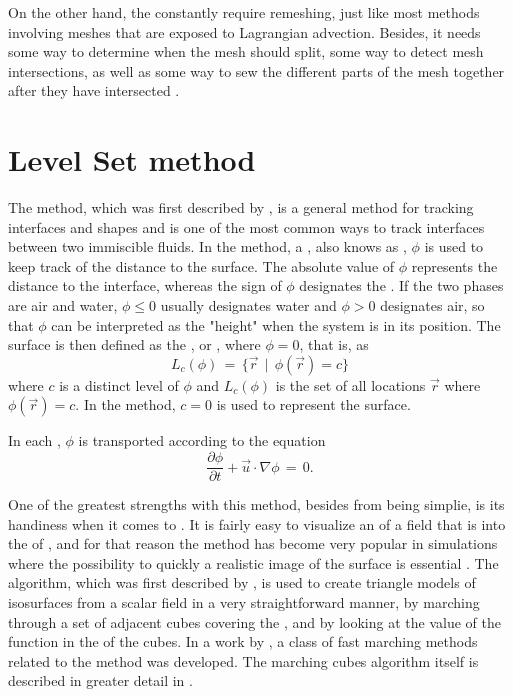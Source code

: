 On the other hand, the constantly require remeshing, just like most methods involving meshes that are exposed to Lagrangian advection. Besides, it needs some way to determine when the mesh should split, some way to detect mesh intersections, as well as some way to sew the different parts of the mesh together after they have intersected \citep{Wojtan2009}.

\section{Level Set method}

The \LS method, which was first described by \citet{Osher1988}, is a general method for tracking interfaces and shapes and is one of the most common ways to track interfaces between two immiscible fluids. In the \LS method, a , also knows as , $\phi$ is used to keep track of the distance to the surface. The absolute value of $\phi$ represents the distance to the interface, whereas the sign of $\phi$ designates the \phase. If the two phases are air and water, $\phi \leq 0$ usually designates water and $\phi > 0$ designates air, so that $\phi$ can be interpreted as the "height" when the system is in its \equilibrium position. The surface is then defined as the \isosurface, or , where $\phi = 0$, that is, as
%
\begin{equation} \label{eq:level_set}
L_c(\phi) \,=\, \{\vec{r} \,\mid\, \phi(\vec{r})=c\}
\end{equation}
%
where $c$ is a distinct level of $\phi$ and $L_c(\phi)$ is the set of all locations $\vec{r}$ where $\phi(\vec{r}) = c$. In the \LS method, $c = 0$ is used to represent the surface.

In each , $\phi$ is transported according to the equation
%
\begin{equation} \label{eq:level_set_function_transport}
\frac{\partial\phi}{\partial t} + \vec{u}\cdot\nabla\phi \,=\, 0.
\end{equation}

One of the greatest strengths with this method, besides from being simplie, is its handiness when it comes to . It is fairly easy to visualize an \isosurface of a field that is \discretized into the \nodes of , and for that reason the \LS method has become very popular in \FVM simulations where the possibility to quickly \render a realistic image of the surface is essential \citep{Losasso2004,Chentanez2011}. The  algorithm, which was first described by \citet{Lorensen1987}, is used to create triangle models of isosurfaces from a scalar field in a very straightforward manner, by marching through a set of adjacent cubes covering the , and by looking at the value of the function in the  of the cubes. In a work by \citet{Sethian1995}, a class of fast marching methods related to the \LS method was developed. The marching cubes algorithm itself is described in greater detail in .


